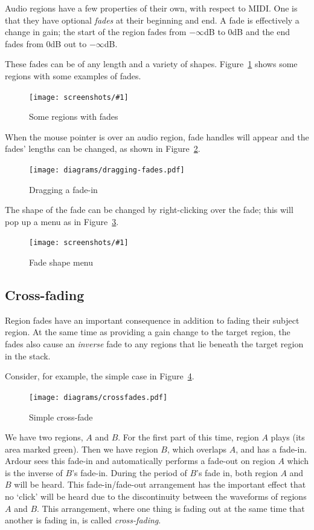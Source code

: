 \documentclass[10pt,a4paper]{book}
\newcommand{\screenshot}[3]{%
\begin{figure}[ht]%
\begin{center}
\texttt{[image: screenshots/\#1]}
\end{center}
\caption{#2}
\label{#3}
\end{figure}}
\begin{document}
{Audio regions have a few properties of their own, with respect to
MIDI\@.  One is that they have optional \emph{fades} at their
beginning and end.  A fade is effectively a change in gain; the start
of the region fades from $-\infty$dB to $0$dB and the end fades from
$0$dB out to $-\infty$dB.  

These fades can be of any length and a variety of shapes.
Figure~\ref{fig:region-fades} shows some regions with some examples of fades.

\screenshot{region-fades.png}{Some regions with fades}{fig:region-fades}

When the mouse pointer is over an audio region, fade handles will
appear and the fades' lengths can be changed, as shown in
Figure~\ref{fig:dragging-fades}.

\begin{figure}[ht]
\begin{center}
\texttt{[image: diagrams/dragging-fades.pdf]}
\end{center}
\caption{Dragging a fade-in}
\label{fig:dragging-fades}
\end{figure}

The shape of the fade can be changed by right-clicking over the fade;
this will pop up a menu as in Figure~\ref{fig:fades-menu}.

\screenshot{fades-menu.png}{Fade shape menu}{fig:fades-menu}


\subsection{Cross-fading}

Region fades have an important consequence in addition to fading their
subject region.  At the same time as providing a gain change to the
target region, the fades also cause an \emph{inverse} fade to any
regions that lie beneath the target region in the stack.

Consider, for example, the simple case in Figure~\ref{fig:crossfades}.

\begin{figure}[ht]
\begin{center}
\texttt{[image: diagrams/crossfades.pdf]}
\end{center}
\caption{Simple cross-fade}
\label{fig:crossfades}
\end{figure}

We have two regions, $A$ and $B$.  For the first part of this time,
region $A$ plays (its area marked green).  Then we have region $B$,
which overlaps $A$, and has a fade-in.  Ardour sees this fade-in and
automatically performs a fade-out on region $A$ which is the inverse
of $B$'s fade-in.  During the period of $B$'s fade in, both region $A$
and $B$ will be heard.  This fade-in/fade-out arrangement has the
important effect that no `click' will be heard due to the
discontinuity between the waveforms of regions $A$ and $B$.  This
arrangement, where one thing is fading out at the same time that
another is fading in, is called \emph{cross-fading}.

}
\end{document}
